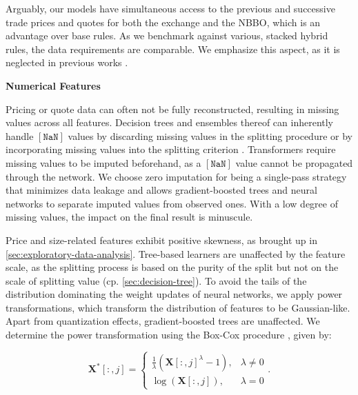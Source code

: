 Arguably, our models have simultaneous access to the previous and successive trade prices and quotes for both the exchange and the NBBO, which is an advantage over base rules. As we benchmark against various, stacked hybrid rules, the data requirements are comparable. We emphasize this aspect, as it is neglected in previous works \autocites[][485]{blazejewskiLocalNonParametricModel2005}[][48]{ronenMachineLearningTrade2022}[][9]{rosenthalModelingTradeDirection2012}.

\textbf{Numerical Features}

Pricing or quote data can often not be fully reconstructed, resulting in missing values across all features. Decision trees and ensembles thereof can inherently handle $\mathtt{[NaN]}$ values by discarding missing values in the splitting procedure \autocite[][150--152]{breimanClassificationRegressionTrees2017} or by incorporating missing values into the splitting criterion \autocite[][951]{twalaGoodMethodsCoping2008}. Transformers require missing values to be imputed beforehand, as a $\mathtt{[NaN]}$ value cannot be propagated through the network. We choose zero imputation for being a single-pass strategy that minimizes data leakage and allows gradient-boosted trees and neural networks to separate imputed values from observed ones. With a low degree of missing values, the impact on the final result is minuscule.

Price and size-related features exhibit positive skewness, as brought up in \cref{sec:exploratory-data-analysis}. Tree-based learners are unaffected by the feature scale, as the splitting process is based on the purity of the split but not on the scale of splitting value (cp. \cref{sec:decision-tree}). To avoid the tails of the distribution dominating the weight updates of neural networks, we apply power transformations, which transform the distribution of features to be Gaussian-like. Apart from quantization effects, gradient-boosted trees are unaffected. We determine the power transformation using the Box-Cox procedure \autocite[][214]{boxAnalysisTransformations2022}, given by:

\begin{equation}
    \mathbf{X}^{*}\left[:,j\right]= \begin{cases}\frac{1}{\lambda}(\mathbf{X}\left[:,j\right]^\lambda-1), & \lambda \neq 0 \\ \log (\mathbf{X}\left[:,j\right]),& \lambda=0\end{cases}.
\label{eq:box-cox-test}
\end{equation}


